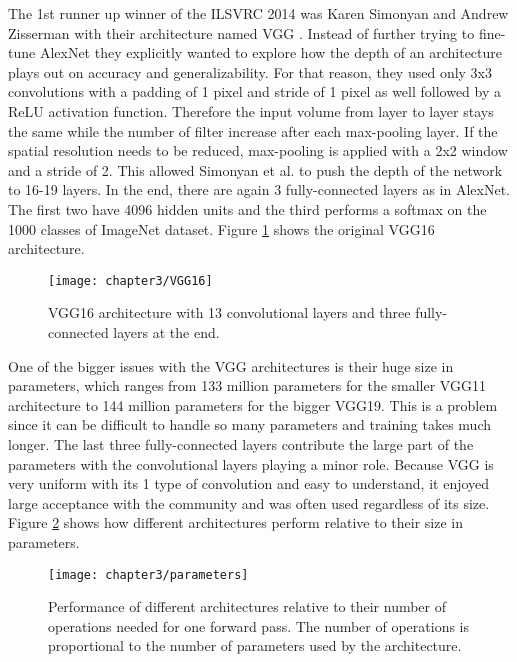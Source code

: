 The 1st runner up winner of the ILSVRC 2014 was Karen Simonyan and Andrew Zisserman with their architecture named VGG \cite{simonyan2014very}. Instead of further trying to fine-tune AlexNet they explicitly wanted to explore how the depth of an architecture plays out on accuracy and generalizability. For that reason, they used only 3x3 convolutions with a padding of 1 pixel and stride of 1 pixel as well followed by a ReLU activation function. Therefore the input volume from layer to layer stays the same while the number of filter increase after each max-pooling layer. If the spatial resolution needs to be reduced, max-pooling is applied with a 2x2 window and a stride of 2. This allowed Simonyan et al. to push the depth of the network to 16-19 layers. In the end, there are again 3 fully-connected layers as in AlexNet. The first two have 4096 hidden units and the third performs a softmax on the 1000 classes of ImageNet dataset. Figure \ref{fig:vgg16} shows the original VGG16 architecture.

\begin{figure}[H]
  \centering
  \caption{VGG16 architecture with 13 convolutional layers and three fully-connected layers at the end. \cite{ferguson2017automatic}}
  \texttt{[image: chapter3/VGG16]}
  \label{fig:vgg16}
\end{figure}

One of the bigger issues with the VGG architectures is their huge size in parameters, which ranges from 133 million parameters for the smaller VGG11 architecture to 144 million parameters for the bigger VGG19. This is a problem since it can be difficult to handle so many parameters and training takes much longer. The last three fully-connected layers contribute the large part of the parameters with the convolutional layers playing a minor role. Because VGG is very uniform with its 1 type of convolution and easy to understand, it enjoyed large acceptance with the community and was often used regardless of its size. Figure \ref{fig:parameters} shows how different architectures perform relative to their size in parameters.

\begin{figure}[H]
  \centering
  \caption{Performance of different architectures relative to their number of operations needed for one forward pass. The number of operations is proportional to the number of parameters used by the architecture. \cite{canziani2016analysis}}
  \texttt{[image: chapter3/parameters]}
  \label{fig:parameters}
\end{figure}

